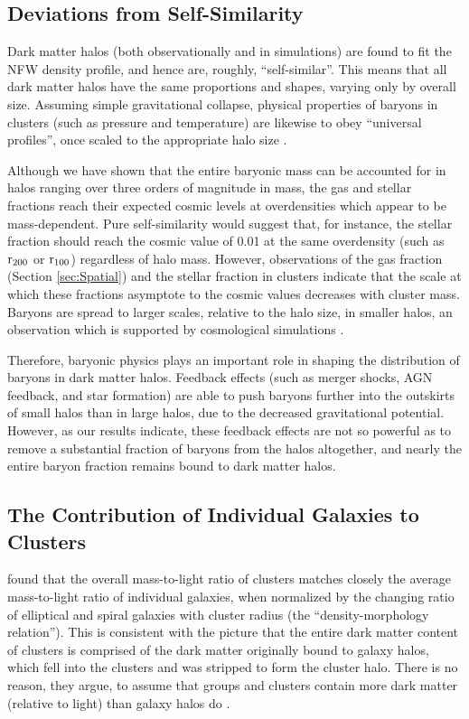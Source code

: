 \subsection{Deviations from Self-Similarity}
\label{sec:Implications.Invariance}

Dark matter halos (both observationally and in simulations) are found
to fit the NFW density profile, and hence are, roughly,
``self-similar''. This means that all dark matter halos have the same
proportions and shapes, varying only by overall size. Assuming simple
gravitational collapse, physical properties of baryons in clusters
(such as pressure and temperature) are likewise to obey ``universal
profiles'', once scaled to the appropriate halo size
.

Although we have shown that the entire baryonic mass can be accounted
for in halos ranging over three orders of magnitude in mass, the gas
and stellar fractions reach their expected cosmic levels at
overdensities which appear to be mass-dependent. Pure self-similarity
would suggest that, for instance, the stellar fraction should reach
the cosmic value of 0.01 at the same overdensity (such as $\textrm{r\ensuremath{_{200}}}$ or
$\textrm{r}{}_{100}$) regardless of halo mass. However, observations of
the gas fraction (Section \ref{sec:Spatial}) and the stellar fraction
\citep{Bahcall2014} in clusters indicate that the scale at which these
fractions asymptote to the cosmic values decreases with cluster
mass. Baryons are spread to larger scales, relative to the halo size,
in smaller halos, an observation which is supported by cosmological
simulations \citep{Battaglia2013}.

Therefore, baryonic physics plays an important role in shaping the
distribution of baryons in dark matter halos. Feedback effects (such
as merger shocks, AGN feedback, and star formation) are able to push
baryons further into the outskirts of small halos than in large halos,
due to the decreased gravitational potential. However, as our results
indicate, these feedback effects are not so powerful as to remove a
substantial fraction of baryons from the halos altogether, and nearly
the entire baryon fraction remains bound to dark matter halos.

\subsection{The Contribution of Individual Galaxies to Clusters}
\label{sec:Implications.Individual}

\citet{Bahcall2014} found that the overall mass-to-light ratio of
clusters matches closely the average mass-to-light ratio of individual
galaxies, when normalized by the changing ratio of elliptical and
spiral galaxies with cluster radius (the ``density-morphology
relation''). This is consistent with the picture that
the entire dark matter content of clusters is comprised of the dark
matter originally bound to galaxy halos, which fell into the clusters
and was stripped to form the cluster halo. There is no reason, they
argue, to assume that groups and clusters contain more dark matter (relative to
light) than galaxy halos do . 

